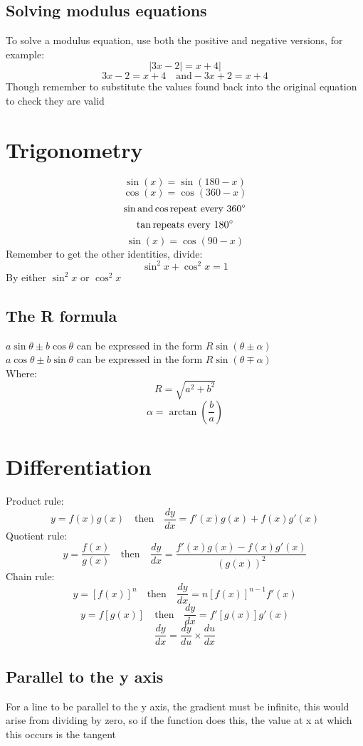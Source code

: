 \documentclass{article}[18pt]
\begin{document}
\subsection{Solving modulus equations}
To solve a modulus equation, use both the positive and negative versions, for example:
$$|3x-2|=x+4|$$
$$3x-2=x+4 \quad \textrm{and} -3x+2=x+4$$
Though remember to substitute the values found back into the original equation to check they are valid
\section{Trigonometry}
$$\sin(x)=\sin(180-x)$$
$$\cos(x)=\cos(360-x)$$
$$\sin \textrm{and} \cos \textrm{repeat every 360}\degree$$
$$\tan \textrm{repeats every 180}\degree$$
$$\sin(x)=\cos(90-x)$$
Remember to get the other identities, divide:
$$\sin^2x+\cos^2x=1$$
By either $\sin^2x$ or $\cos^2x$
\subsection{The R formula}
$a\sin\theta\pm b\cos\theta$ can be expressed in the form $R\sin(\theta\pm\alpha)$\\
$a\cos\theta\pm b\sin\theta$ can be expressed in the form $R\sin(\theta\mp\alpha)$\\
Where: 
$$R = \sqrt{a^2+b^2}$$
$$\alpha=\arctan(\frac{b}{a})$$
\newpage
\section{Differentiation}
Product rule:
$$y=f(x)g(x)\quad \textrm{then} \quad\frac{dy}{dx}=f'(x)g(x)+f(x)g'(x)$$
Quotient rule:
$$y=\frac{f(x)}{g(x)} \quad \textrm{then} \quad\frac{dy}{dx}=\frac{f'(x)g(x)-f(x)g'(x)}{(g(x))^2}$$
Chain rule:
$$y=[f(x)]^n \quad \textrm{then} \quad \frac{dy}{dx}=n[f(x)]^{n-1}f'(x)$$
$$y=f[g(x)] \quad \textrm{then} \quad \frac{dy}{dx}=f'[g(x)]g'(x)$$
$$\frac{dy}{dx}=\frac{dy}{du}\times\frac{du}{dx}$$
\subsection{Parallel to the y axis}
For a line to be parallel to the y axis, the gradient must be infinite, this would arise from dividing by zero, so if the function does this, the value at x at which this occurs is the tangent
\end{document}
